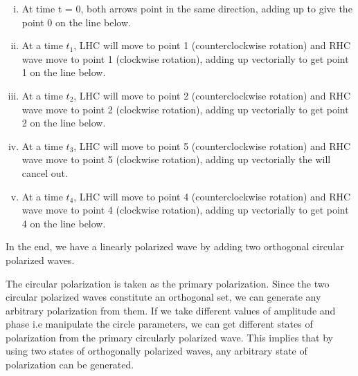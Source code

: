 \begin{enumerate}[(i)]
\item At time t = 0, both arrows point in the same direction, adding up to give the point 0 on the line below.
\item At a time $ t_{1} $, LHC will move to point 1 (counterclockwise rotation) and RHC wave move to point 1 (clockwise rotation), adding up vectorially to get point 1 on the line below.
\item At a time $ t_{2} $, LHC will move to point 2 (counterclockwise rotation) and RHC wave move to point 2 (clockwise rotation), adding up vectorially to get point 2 on the line below.
\item At a time $ t_{3} $, LHC will move to point 5 (counterclockwise rotation) and RHC wave move to point 5 (clockwise rotation), adding up vectorially the will cancel out.
\item At a time $ t_{4} $, LHC will move to point 4 (counterclockwise rotation) and RHC wave move to point 4 (clockwise rotation), adding up vectorially to get point 4 on the line below.
\end{enumerate}

In the end, we have a linearly polarized wave by adding two orthogonal circular polarized waves.

The circular polarization is taken as the primary polarization. Since the two circular polarized waves constitute an orthogonal set, we can generate any arbitrary polarization from them. If we take different values of amplitude and phase i.e manipulate the circle parameters, we can get different states of polarization from the primary circularly polarized wave. This implies that by using two states of orthogonally polarized waves, any arbitrary state of polarization can be generated.


